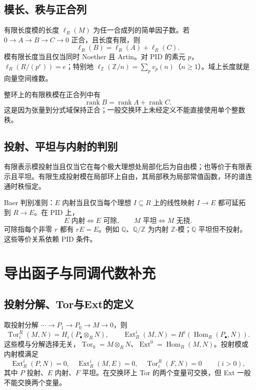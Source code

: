 \documentclass[../main.tex]{subfiles}
\begin{document}
\subsection{模长、秩与正合列}
有限长度模的长度 $\ell_R(M)$ 为任一合成列的简单因子数。若 $0\to A\to B\to C\to0$ 正合，且长度有限，则
\[
\ell_R(B)=\ell_R(A)+\ell_R(C).
\]
模有限长度当且仅当同时 Noether 且 Artin。对 PID 的素元 $p$，$\ell_R(R/(p^e))=e$；特别地 $\ell_{\mathbb Z}(\mathbb Z/n)=\sum_pv_p(n)$（$n\ge1$）。域上长度就是向量空间维数。

整环上的有限秩模在正合列中有
\[
\operatorname{rank}B=\operatorname{rank}A+\operatorname{rank}C.
\]
这是因为张量到分式域保持正合；一般交换环上未经定义不能直接使用单个整数秩。

\subsection{投射、平坦与内射的判别}
有限表示模投射当且仅当它在每个极大理想处局部化后为自由模；也等价于有限表示且平坦。有限生成投射模在局部环上自由，其局部秩为局部常值函数，环的谱连通时秩恒定。

Baer 判别准则：$E$ 内射当且仅当每个理想 $I\subseteq R$ 上的线性映射 $I\to E$ 都可延拓到 $R\to E$。在 PID 上，
\[
E\text{ 内射}\iff E\text{ 可除},\qquad
M\text{ 平坦}\iff M\text{ 无挠}.
\]
可除指每个非零 $r$ 都有 $rE=E$。例如 $\mathbb Q$、$\mathbb Q/\mathbb Z$ 为内射 $\mathbb Z$-模；$\mathbb Q$ 平坦但不投射。这些等价关系依赖 PID 条件。

\section{导出函子与同调代数补充}
\subsection{投射分解、Tor与Ext的定义}
取投射分解 $\cdots\to P_1\to P_0\to M\to0$，则
\[
\operatorname{Tor}_i^R(M,N)=H_i(P_\bullet\otimes_RN),\qquad
\operatorname{Ext}_R^i(M,N)=H^i(\operatorname{Hom}_R(P_\bullet,N)).
\]
这些模与分解选择无关，$\operatorname{Tor}_0=M\otimes_RN$、$\operatorname{Ext}^0=\operatorname{Hom}_R(M,N)$。投射模或内射模满足
\[
\operatorname{Ext}_R^{i}(P,N)=0,\quad
\operatorname{Ext}_R^{i}(M,E)=0,\quad
\operatorname{Tor}_i^R(F,N)=0\qquad(i>0),
\]
其中 $P$ 投射、$E$ 内射、$F$ 平坦。在交换环上 Tor 的两个变量可交换，但 Ext 一般不能交换两个变量。
\end{document}
